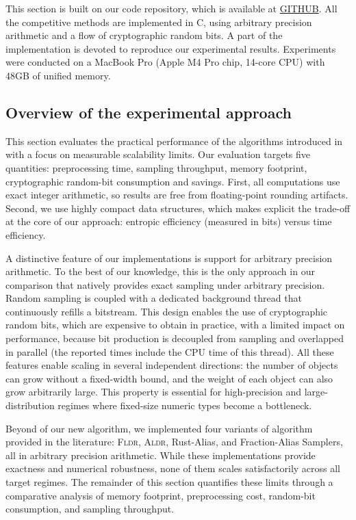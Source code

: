
This section is built on our code repository, which is available at \url{GITHUB}.
All the competitive methods are implemented in C, using arbitrary precision arithmetic
and a flow of cryptographic random bits. A part of the implementation is devoted to reproduce our experimental results.
Experiments were conducted on a MacBook Pro (Apple M4 Pro chip, 14-core CPU) with 48GB of unified memory.


\subsection{Overview of the experimental approach}

This section evaluates the practical performance of the algorithms introduced in 
with a focus on measurable scalability limits.
Our evaluation targets five quantities: preprocessing time, sampling throughput, memory footprint, cryptographic random-bit consumption and savings.
First, all computations use exact integer arithmetic, so results are free from
floating-point rounding artifacts. Second, we use highly
compact data structures, which makes explicit the trade-off at the core of our approach:
entropic efficiency (measured in bits) versus time efficiency.

A distinctive feature of our implementations is support for arbitrary precision arithmetic. To the best of our knowledge,
this is the only approach in our comparison that natively provides exact sampling under arbitrary precision.
Random sampling is coupled with a dedicated background thread that continuously refills a bitstream.
This design enables the use of cryptographic random bits, which are expensive to obtain in practice,
with a limited impact on performance, because bit production is decoupled from sampling and overlapped in parallel (the reported times include the CPU time of this thread).
All these features enable scaling in several independent directions: the number of objects can grow
without a fixed-width bound, and the weight of each object can also grow arbitrarily large.
This property is essential for high-precision and large-distribution regimes where fixed-size numeric types become a bottleneck.

Beyond of our new algorithm, we implemented four variants of algorithm provided in the literature:
\textsc{Fldr}, \textsc{Aldr}, Rust-Alias, and Fraction-Alias Samplers, all in arbitrary precision arithmetic.
While these implementations provide exactness and numerical robustness, none of them scales satisfactorily
across all target regimes. The remainder of this section quantifies these limits through a comparative analysis
of memory footprint, preprocessing cost, random-bit consumption, and sampling throughput.


